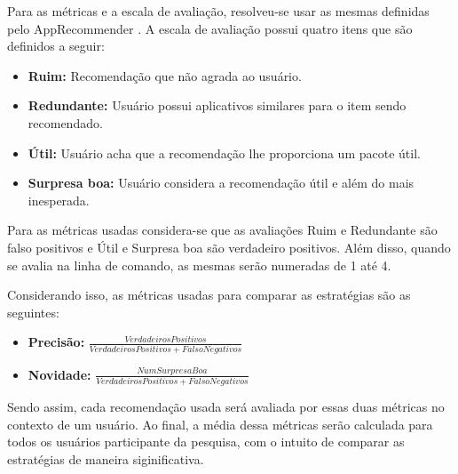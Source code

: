 Para as métricas e a escala de avaliação, resolveu-se usar as mesmas definidas
pelo AppRecommender \cite{araujo2011apprecommender}. A escala de avaliação
possui quatro itens que são definidos a seguir:

\begin{itemize}
    \item \textbf{Ruim: } Recomendação que não agrada ao usuário.
    \item \textbf{Redundante: } Usuário possui aplicativos similares para o item
        sendo recomendado.
    \item \textbf{Útil: } Usuário acha que a recomendação lhe proporciona um
            pacote útil.
    \item \textbf{Surpresa boa: } Usuário considera a recomendação útil e além
        do mais inesperada.
\end{itemize}

Para as métricas usadas considera-se que as avaliações Ruim e Redundante são
falso positivos e Útil e Surpresa boa são verdadeiro positivos. Além disso,
quando se avalia na linha de comando, as mesmas serão numeradas de 1 até 4.

Considerando isso, as métricas usadas para comparar as estratégias são as
seguintes:

\begin{itemize}
    \item \textbf{Precisão: } $\frac{VerdadeirosPositivos}{VerdadeirosPositivos
        + FalsoNegativos}$
    \item \textbf{Novidade: } $\frac{NumSurpresaBoa}{VerdadeirosPositivos +
        FalsoNegativos}$
\end{itemize}

Sendo assim, cada recomendação usada será avaliada por essas duas métricas no
contexto de um usuário. Ao final, a média dessa métricas serão calculada para
todos os usuários participante da pesquisa, com o intuito de comparar as
estratégias de maneira siginificativa.
